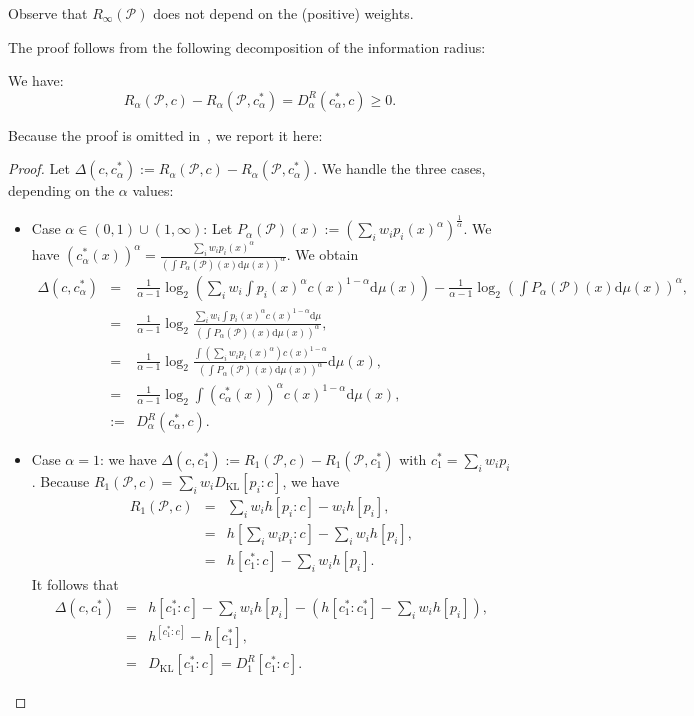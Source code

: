 \documentclass[entropy,article,accept,oneauthor,pdftex,entropy]{Definitions/mdpi}
\def\KL{\mathrm{KL}}
\def\dmu{\mathrm{d}\mu}
\def\calP{\mathcal{P}}
\def\dmu{\mathrm{d}\mu}
\begin{document}
\begin{paracol}{2}
Observe that $R_\infty(\calP)$ does not depend on the (positive) weights.

The proof follows from the following decomposition of the information radius:
\begin{Proposition}\label{prop:decomp}
We have:
\begin{equation}
R_\alpha(\calP,c) - R_\alpha(\calP,c^*_\alpha) = D_\alpha^R(c^*_\alpha,c)\geq 0.
\end{equation}
\end{Proposition}

Because the proof is omitted in~\cite{Sibson-1969}, we report it here:

\begin{proof}
Let $\Delta(c,c^*_\alpha):=R_\alpha(\calP,c) - R_\alpha(\calP,c^*_\alpha)$.
We handle the three cases, depending on the $\alpha$ values:

\begin{itemize}
\item Case $\alpha\in(0,1)\cup(1,\infty)$:
Let $P_\alpha(\calP)(x):=\left(\sum_i w_i p_i(x)^\alpha\right)^{\frac{1}{\alpha}}$.
We have $(c_\alpha^*(x))^\alpha = \frac{\sum_i  w_i p_i(x)^\alpha}{\left(\int P_\alpha(\calP)(x)\dmu(x)\right)^\alpha}$.
We obtain
\vspace{-6pt}
\begingroup\makeatletter\def\f@size{8}\check@mathfonts
\def\maketag@@@#1{\hbox{\m@th\normalsize\normalfont#1}}%
\begin{eqnarray}
\Delta(c,c^*_\alpha) &=& \frac{1}{\alpha-1}\log_2\left(\sum_i w_i\int p_i(x)^\alpha c(x)^{1-\alpha}\dmu(x)\right)
- \frac{1}{\alpha-1}\log_2\left( \int P_\alpha(\calP)(x)\dmu(x)\right)^\alpha,\\
&=&\frac{1}{\alpha-1}\log_2 \frac{\sum_i w_i\int p_i(x)^\alpha c(x)^{1-\alpha}\dmu}{(\int P_\alpha(\calP)(x)\dmu(x))^\alpha},\\
&=&\frac{1}{\alpha-1}\log_2 \frac{\int  (\sum_i w_ip_i(x)^\alpha) c(x)^{1-\alpha}}{(\int P_\alpha(\calP)(x)\dmu(x))^\alpha}\dmu(x),\\
&=&\frac{1}{\alpha-1}\log_2 \int (c_\alpha^*(x))^\alpha c(x)^{1-\alpha}\dmu(x),\\
&:=& D_\alpha^R(c^*_\alpha,c).
\end{eqnarray}
\endgroup

\item Case $\alpha=1$: we have $\Delta(c,c^*_1):=R_1(\calP,c) - R_1(\calP,c^*_1)$ with $c^*_1=\sum_i w_ip_i$.
Because $R_1(\calP,c)=\sum_i w_i D_\KL[p_i:c]$, we have
\begin{eqnarray}
R_1(\calP,c) &=&\sum_i w_i h[p_i:c]- w_i h[p_i],\\
&=& h[\sum_i w_ip_i:c] - \sum_i w_i h[p_i],\\
&=&  h[c^*_1:c] - \sum_i w_i h[p_i].
\end{eqnarray}
It follows that
\begin{eqnarray}
\Delta(c,c^*_1)&=&h[c^*_1:c] - \sum_i w_i h[p_i] - \left(h[c^*_1:c_1^*] - \sum_i w_i h[p_i]\right),\\
&=& h^[c^*_1:c]-h[c^*_1],\\
&=& D_\KL[c^*_1:c]=D_1^R[c^*_1:c].
\end{eqnarray}


\end{itemize}
\end{proof}
\end{paracol}
\end{document}
